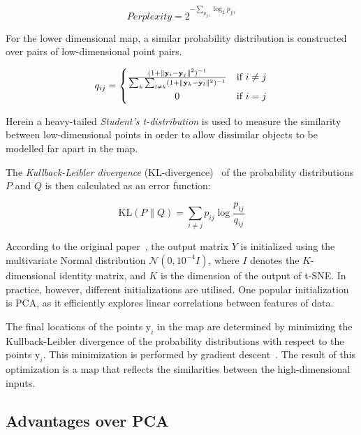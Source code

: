 \begin{equation}
	\label{eq:tsne:perlexity}
	Perplexity = 2^{-\sum_{p_{j|i}} \log_2 p_{j|i}}
\end{equation}

For the lower dimensional map, a similar probability distribution is constructed over pairs of low-dimensional point pairs.

\begin{equation}
	\label{eq:tsne:qij}
	q_{ij} =
	\begin{cases}
		{\frac{(1+\lVert \mathbf{y}_{i} - \mathbf{y}_{j}\rVert^{2})^{-1}}{\sum_{k}\sum_{l \neq k}(1+\lVert \mathbf{y}_{k} - \mathbf{y}_{l}\rVert ^{2})^{-1}}} & \textrm{if } i \neq j \\
		\hfil 0 & \textrm{if } i = j
	\end{cases}
\end{equation}

Herein a heavy-tailed \textit{Student's t-distribution} is used to measure the similarity between low-dimensional points in order to allow dissimilar objects to be modelled far apart in the map.

The \textit{Kullback-Leibler divergence} (KL-divergence)~\cite{bib:kldiv} of the probability distributions $P$ and $Q$ is then calculated as an error function:

\begin{equation}
	\label{eq:KLdiv}
 	\mathrm{KL} \left(P \parallel Q \right) = \sum_{i\neq j} p_{ij} \log{\frac{p_{ij}}{q_{ij}}}
\end{equation}

According to the original paper~\cite{bib:tsne}, the output matrix $Y$ is initialized using the multivariate Normal distribution  $\mathcal{N}(0,10^{-4}I)$, where $I$ denotes the $K$-dimensional identity matrix, and $K$ is the dimension of the output of t-SNE. In practice, however, different initializations are utilised. One popular initialization is PCA, as it efficiently explores linear correlations between features of data.

The final locations of the points $\mathrm{y}_i$ in the map are determined by minimizing the Kullback-Leibler divergence of the probability distributions with respect to the points $\mathrm{y}_i$. This minimization is performed by gradient descent~\cite{bib:gd}. The result of this optimization is a map that reflects the similarities between the high-dimensional inputs.

\subsection{Advantages over PCA}

